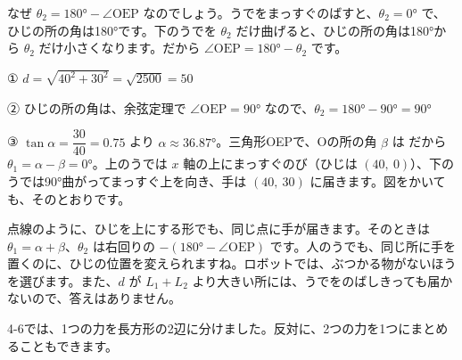 \noindent なぜ $\theta_2=\ang{180}-\angle\mathrm{OEP}$ なのでしょう。うでをまっすぐのばすと、$\theta_2=\ang{0}$ で、ひじの所の角は\ang{180}です。下のうでを $\theta_2$ だけ曲げると、ひじの所の角は\ang{180}から $\theta_2$ だけ小さくなります。だから $\angle\mathrm{OEP}=\ang{180}-\theta_2$ です。

① $d=\sqrt{40^2+30^2}=\sqrt{2500}=50$\par
② ひじの所の角は、余弦定理で
$\angle\mathrm{OEP}=\ang{90}$ なので、$\theta_2=\ang{180}-\ang{90}=\ang{90}$\par
③ $\tan\alpha=\dfrac{30}{40}=0.75$ より $\alpha\approx\ang{36.87}$。三角形OEPで、Oの所の角 $\beta$ は
だから $\theta_1=\alpha-\beta=\ang{0}$。上のうでは $x$ 軸の上にまっすぐのび（ひじは $(40,\ 0)$）、下のうでは\ang{90}曲がってまっすぐ上を向き、手は $(40,\ 30)$ に届きます。図をかいても、そのとおりです。

点線のように、ひじを上にする形でも、同じ点に手が届きます。そのときは $\theta_1=\alpha+\beta$、$\theta_2$ は右回りの $-(\ang{180}-\angle\mathrm{OEP})$ です。人のうでも、同じ所に手を置くのに、ひじの位置を変えられますね。ロボットでは、ぶつかる物がないほうを選びます。また、$d$ が $L_1+L_2$ より大きい所には、うでをのばしきっても届かないので、答えはありません。


\leavevmode\label{bk:4-7:chikara}4-6では、1つの力を長方形の2辺に分けました。反対に、2つの力を1つにまとめることもできます。

